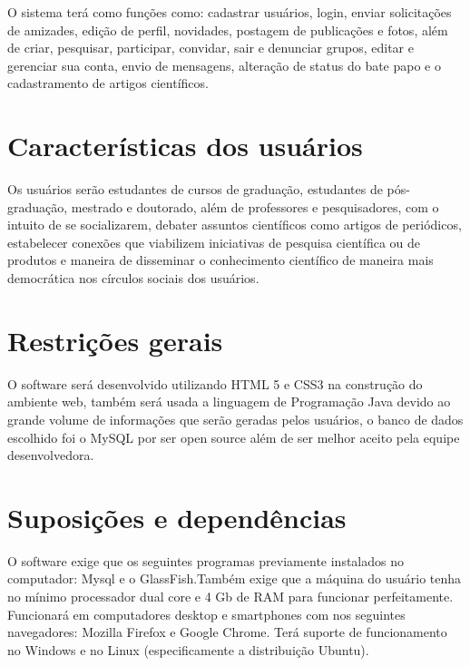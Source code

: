 O sistema terá como funções como: cadastrar usuários, login, enviar solicitações de amizades, edição de perfil, novidades, postagem de publicações e fotos, além de criar, pesquisar, participar, convidar, sair e denunciar grupos, editar e gerenciar sua conta, envio de mensagens, alteração de status do bate papo e o cadastramento de artigos científicos.

\section{Características dos usuários}
Os usuários serão estudantes de cursos de graduação, estudantes de pós-graduação, mestrado e doutorado, além de professores e pesquisadores, com o intuito de se socializarem, debater assuntos científicos como artigos de periódicos, estabelecer conexões que viabilizem iniciativas de pesquisa científica ou de produtos e maneira de disseminar o conhecimento científico de maneira mais democrática nos círculos sociais dos usuários.


\section{Restrições gerais}
O software será desenvolvido utilizando HTML 5 e CSS3 na construção do ambiente web, também será usada a linguagem de Programação Java devido ao grande volume de informações que serão geradas pelos usuários, o banco de dados escolhido foi o MySQL por ser open source além de ser melhor aceito pela equipe desenvolvedora.

\section{Suposições e dependências}
O software exige que os seguintes programas previamente instalados no computador: Mysql e o GlassFish.Também exige que a máquina do usuário tenha no mínimo processador dual core e 4 Gb de RAM para funcionar perfeitamente. Funcionará em computadores desktop e smartphones com nos seguintes navegadores: Mozilla Firefox e Google Chrome. Terá suporte de funcionamento no Windows e no Linux (especificamente a distribuição Ubuntu).